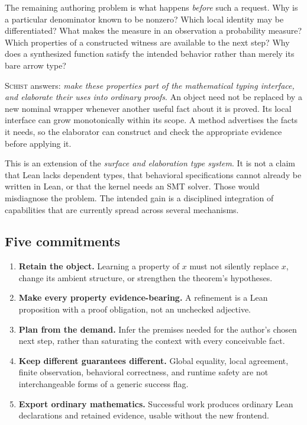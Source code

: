 \documentclass[11pt,a4paper]{article}
\newcommand{\Schist}{\textsc{Schist}}
\theoremstyle{definition}
\begin{document}
The remaining authoring problem is what happens \emph{before} such a request.
Why is a particular denominator known to be nonzero? Which local identity may
be differentiated? What makes the measure in an observation a probability
measure? Which properties of a constructed witness are available to the next
step? Why does a synthesized function satisfy the intended behavior rather than
merely its bare arrow type?

\Schist{} answers: \emph{make these properties part of the mathematical typing
interface, and elaborate their uses into ordinary proofs}. An object need not
be replaced by a new nominal wrapper whenever another useful fact about it is
proved. Its local interface can grow monotonically within its scope. A method
advertises the facts it needs, so the elaborator can construct and check the
appropriate evidence before applying it.

This is an extension of the \emph{surface and elaboration type system}. It is
not a claim that Lean lacks dependent types, that behavioral specifications
cannot already be written in Lean, or that the kernel needs an SMT solver.
Those would misdiagnose the problem. The intended gain is a disciplined
integration of capabilities that are currently spread across several mechanisms.

\subsection{Five commitments}
\begin{enumerate}
\item \textbf{Retain the object.} Learning a property of $x$ must not silently
replace $x$, change its ambient structure, or strengthen the theorem's hypotheses.
\item \textbf{Make every property evidence-bearing.} A refinement is a Lean
proposition with a proof obligation, not an unchecked adjective.
\item \textbf{Plan from the demand.} Infer the premises needed for the author's
chosen next step, rather than saturating the context with every conceivable fact.
\item \textbf{Keep different guarantees different.} Global equality, local
agreement, finite observation, behavioral correctness, and runtime safety are
not interchangeable forms of a generic success flag.
\item \textbf{Export ordinary mathematics.} Successful work produces ordinary
Lean declarations and retained evidence, usable without the new frontend.
\end{enumerate}
\end{document}
